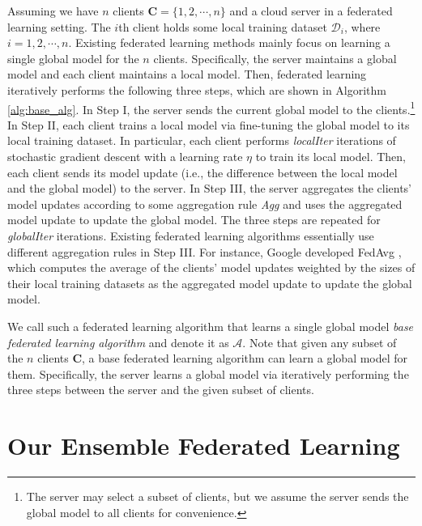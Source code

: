 \documentclass[letterpaper]{article} %
\begin{document}
Assuming we have $n$ clients $\mathbf{C}=\{1,2,\cdots,n\}$ and a cloud server in a federated learning setting. The $i$th client holds some local training dataset $\mathcal{D}_i$, where $i=1,2,\cdots,n$. Existing federated learning methods \cite{konevcny2016federated,mcmahan2016communication,wang2020federated,li2019convergence} mainly focus on learning a single global model for the $n$ clients.
Specifically, the server maintains a global model and each client maintains a local model. Then, federated learning iteratively performs the following three steps, which are shown in Algorithm \ref{alg:base_alg}. In Step I, the server sends the current global model to the clients.\footnote{The server may select a subset of clients, but we assume the server sends the global model to all clients for convenience.} In Step II, each client trains a local model via fine-tuning the global model to its local training dataset. In particular, each client performs \emph{localIter} iterations of stochastic gradient descent with a learning rate $\eta$ to train its local model. Then, each client sends its model update (i.e., the difference between the local model and the global model) to the server. In Step III, the server aggregates the clients' model updates according to some aggregation rule \emph{Agg} and uses the aggregated model update to update the global model. The three steps are repeated for \emph{globalIter} iterations. Existing federated learning algorithms essentially use different aggregation rules in Step III. For instance, Google developed FedAvg \cite{mcmahan2016communication}, which computes the average of the clients' model updates weighted by the sizes of their local training datasets as the aggregated model update  to update the global model.

We call such a federated learning algorithm that learns a single global model  \emph{base federated learning algorithm} and denote it as $\mathcal{A}$. Note that given any subset of the $n$ clients $\mathbf{C}$, a base federated learning algorithm can learn a global model for them. Specifically, the server learns a global model via iteratively performing the three steps between the server and the given subset of clients.


\section{Our Ensemble Federated Learning}
\end{document}
